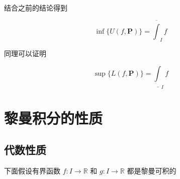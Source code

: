 结合之前的结论得到

\[
 \inf \{ U(f, \mathbf{P}) \}  =  \overline{\int}_I f
\]

同理可以证明


\[
 \sup \{ L(f, \mathbf{P}) \}  =  \underline{\int}_I f
\]

\section{黎曼积分的性质}

\subsection{代数性质}

下面假设有界函数 $f: I \to \mathbb{R}$ 和 $g: I \to \mathbb{R}$ 都是黎曼可积的

